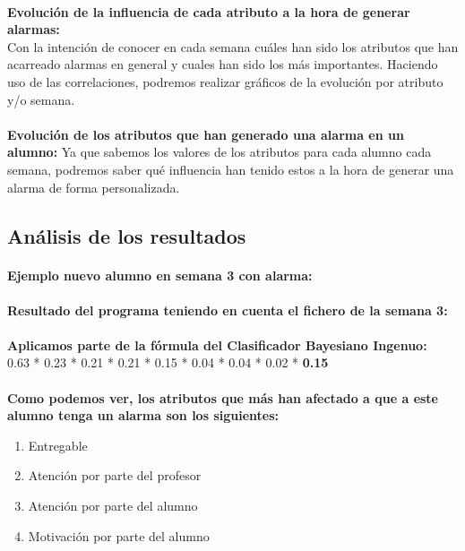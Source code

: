 \paragraph{}
\textbf{Evolución de la influencia de cada atributo a la hora de generar alarmas:}\\
Con la intención de conocer en cada semana cuáles han sido los atributos que
han acarreado alarmas en general y cuales han sido los más
importantes. Haciendo uso de las correlaciones, podremos realizar
gráficos de la evolución por atributo y/o semana. 
\paragraph{}
\textbf{Evolución de los atributos que han generado una alarma en un alumno:} 
Ya que sabemos los valores de los atributos para cada alumno cada semana, podremos saber
qué influencia han tenido estos a la hora de generar una alarma de
forma personalizada.

\subsection{Análisis de los resultados}
\paragraph{}
\textbf{Ejemplo nuevo alumno en semana 3 con alarma:}

\paragraph{}
\paragraph{}
\textbf{Resultado del programa teniendo en cuenta el fichero de la semana 3:}

\paragraph{}
\textbf{Aplicamos parte de la fórmula del Clasificador Bayesiano
  Ingenuo:}\\
0.63 * 0.23 * 0.21 * 0.21 * 0.15 * 0.04 * 0.04 * 0.02 * \textbf{0.15}

\paragraph{}
\textbf{Como podemos ver, los atributos que más han afectado a que a
  este alumno tenga un alarma son los siguientes:}
\begin{enumerate}
\item Entregable
\item Atención por parte del profesor
\item Atención por parte del alumno
\item Motivación por parte del alumno
\end{enumerate}

